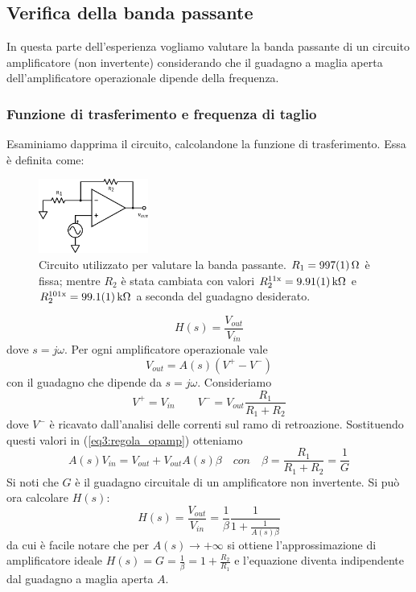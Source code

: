 \newpage
\subsection{Verifica della banda passante}
\label{par3:bode}

In questa parte dell'esperienza vogliamo valutare la banda passante di un circuito amplificatore (non invertente) considerando che il guadagno a maglia aperta dell'amplificatore operazionale dipende della frequenza.

\subsubsection*{Funzione di trasferimento e frequenza di taglio}

Esaminiamo dapprima il circuito, calcolandone la funzione di trasferimento. Essa è definita come:\phantom{xxxxxxxxxxxxxxxxx}
\begin{figure}
  \begin{center}
    \includegraphics[width=0.32\textwidth]{../E03/latex/bandwidth.pdf}
  \end{center}
  \caption{Circuito utilizzato per valutare la banda passante. $R_1=\SI{997\pm1}{\ohm}$ è fissa; mentre $R_2$ è stata cambiata con valori $R_2^{11\mathrm{x}}=\SI{9.91 \pm 0.01}{\kilo\ohm}$ e $R_2^{101\mathrm{x}}=\SI{99.1 \pm 0.1}{\kilo\ohm}$ a seconda del guadagno desiderato.}
  \label{cir3:banda}
\end{figure}
\begin{equation}
H(s)=\frac{V_{out}}{V_{in}}
\label{eq3:def_f_trasf}
\end{equation}
dove $s=j\omega$.
Per ogni amplificatore operazionale vale
\begin{equation}
V_{out}=A(s) (V^+-V^-)
\label{eq3:regola_opamp}
\end{equation}
con il guadagno che dipende da $s=j\omega$.
Consideriamo
$$V^+ = V_{in} \qquad V^-=V_{out} \frac{R_1}{R_1+R_2}$$
dove $V^-$ è ricavato dall'analisi delle correnti sul ramo di retroazione.
Sostituendo questi valori in (\ref{eq3:regola_opamp}) otteniamo
$$A(s) V_{in} = V_{out} + V_{out} A(s) \beta \quad con \quad \beta = \frac{R_1}{R_1+R_2} = \frac{1}{G}$$
Si noti che $G$ è il guadagno circuitale di un amplificatore non invertente.
Si può ora calcolare $H(s)$:
\begin{equation}
H(s)=\frac{V_{out}}{V_{in}}=\frac{1}{\beta}\frac{1}{1+\frac{1}{A(s) \beta}}
\label{eq3:funz_trasfe}
\end{equation}
da cui è facile notare che per $A(s) \rightarrow + \infty$ si ottiene l'approssimazione di amplificatore ideale $H(s)=G=\frac{1}{\beta}=1+\frac{R_2}{R_1}$ e l'equazione diventa indipendente dal guadagno a maglia aperta $A$.

